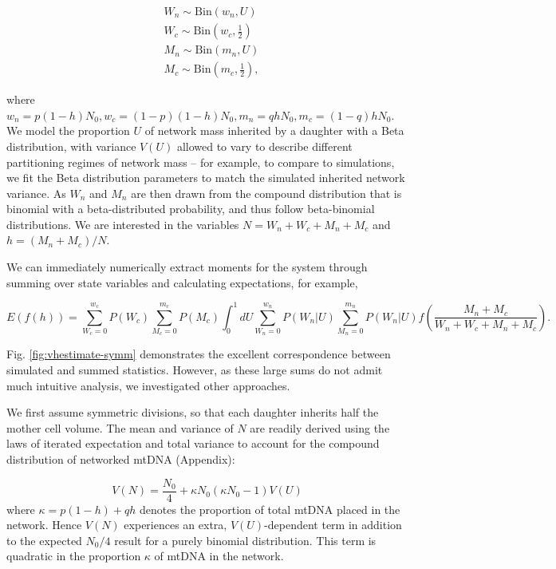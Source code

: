 \documentclass{article}
\begin{document}
\begin{equation}
    \begin{split}
        & W_n \sim \mathrm{Bin}\left(w_n,U\right) \\
        & W_c \sim \mathrm{Bin}\left(w_c,\frac{1}{2}\right) \\
        & M_n \sim \mathrm{Bin}\left(m_n,U\right) \\
        & M_c \sim \mathrm{Bin}\left(m_c,\frac{1}{2}\right),
    \end{split}
\end{equation}

where $w_n = p(1-h)N_0, w_c = (1-p)(1-h)N_0, m_n = qhN_0, m_c = (1-q)hN_0$. We model the proportion $U$ of network mass inherited by a daughter with a Beta distribution, with variance $V(U)$ allowed to vary to describe different partitioning regimes of network mass -- for example, to compare to simulations, we fit the Beta distribution parameters to match the simulated inherited network variance. As $W_n$ and $M_n$ are then drawn from the compound distribution that is binomial with a beta-distributed probability, and thus follow beta-binomial distributions. We are interested in the variables $N = W_n+W_c+M_n+M_c$ and $h = (M_n+M_c)/N$.

We can immediately numerically extract moments for the system through summing over state variables and calculating expectations, for example, 

\begin{equation}
    E(f(h)) = \sum_{W_c = 0}^{w_c} P(W_c) \sum_{M_c = 0}^{m_c} P(M_c) \int_0^1 dU \sum_{W_n = 0}^{w_n} P(W_n|U) \sum_{M_n = 0}^{m_n} P(W_n|U) f\left(\frac{M_n+M_c}{W_n+W_c+M_n+M_c}\right).
\end{equation}


Fig. \ref{fig:vhestimate-symm} demonstrates the excellent correspondence between simulated and summed statistics. However, as these large sums do not admit much intuitive analysis, we investigated other approaches. 

We first assume symmetric divisions, so that each daughter inherits half the mother cell volume. The mean and variance of $N$ are readily derived using the laws of iterated expectation and total variance to account for the compound distribution of networked mtDNA (Appendix):

\begin{equation}
    V(N)=\frac{N_0}{4}+\kappa N_0(\kappa N_0-1)V(U)
\end{equation}
where $\kappa = p(1-h)+qh$ denotes the proportion of total mtDNA placed in the network. Hence $V(N)$ experiences an extra, $V(U)$-dependent term in addition to the expected $N_0/4$ result for a purely binomial distribution. This term is quadratic in the proportion $\kappa$ of mtDNA in the network.
\end{document}
